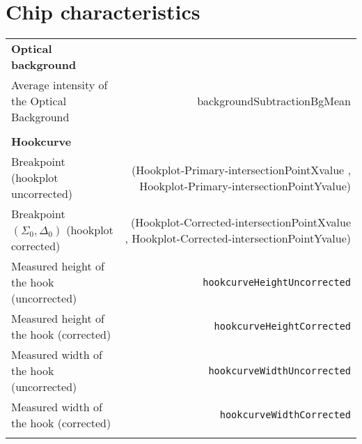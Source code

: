 \documentclass[a4paper, 10pt]{article}
\begin{document}
\section {Chip characteristics} 
\begin{tabular}{lr}
	{\bf Optical background} \\
	Average intensity of the Optical Background &
  backgroundSubtractionBgMean \\ \\
	{\bf Hookcurve} \\
	Breakpoint (hookplot uncorrected) & (Hookplot-Primary-intersectionPointXvalue , Hookplot-Primary-intersectionPointYvalue)\\
	Breakpoint $(\Sigma_{0},\Delta_{0})$ (hookplot corrected) & (Hookplot-Corrected-intersectionPointXvalue , Hookplot-Corrected-intersectionPointYvalue)\\
	Measured height of the hook (uncorrected) &\verb| hookcurveHeightUncorrected| \\
	Measured height of the hook (corrected) &\verb| hookcurveHeightCorrected| \\
	Measured width of the hook (uncorrected) &\verb| hookcurveWidthUncorrected| \\
	Measured width of the hook (corrected) &\verb| hookcurveWidthCorrected| \\ \\


\end{tabular}
\end{document}
